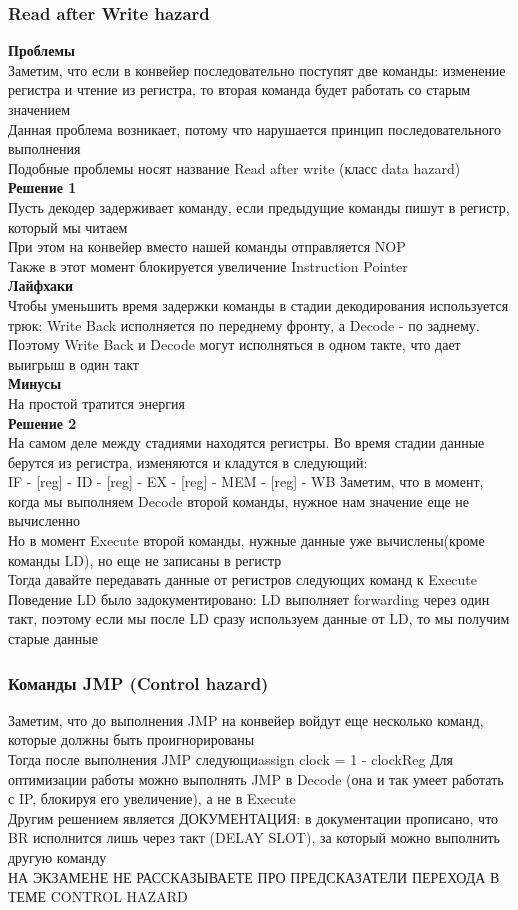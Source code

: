 \documentclass[12pt]{article}
\begin{document}
\subsubsection{Read after Write hazard}
\textbf{Проблемы}\\
Заметим, что если в конвейер последовательно поступят две команды: изменение регистра и чтение из регистра, то вторая команда будет работать со старым значением\\
Данная проблема возникает, потому что нарушается принцип последовательного выполнения\\
Подобные проблемы носят название Read after write (класс data hazard)\\
\textbf{Решение 1}\\
Пусть декодер задерживает команду, если предыдущие команды пишут в регистр, который мы читаем\\
При этом на конвейер вместо нашей команды отправляется NOP\\
Также в этот момент блокируется увеличение Instruction Pointer\\
\textbf{Лайфхаки}\\
Чтобы уменьшить время задержки команды в стадии декодирования используется трюк: Write Back исполняется по переднему фронту, а Decode - по заднему. Поэтому Write Back и Decode могут исполняться в одном такте, что дает выигрыш в один такт\\
\textbf{Минусы}\\
На простой тратится энергия\\
\textbf{Решение 2}\\
На самом деле между стадиями находятся регистры. Во время стадии данные берутся из регистра, изменяются и кладутся в следующий:\\
IF - [reg] - ID - [reg] - EX - [reg] - MEM - [reg] - WB
Заметим, что в момент, когда мы выполняем Decode второй команды, нужное нам значение еще не вычисленно\\
Но в момент Execute второй команды, нужные данные уже вычислены(кроме команды LD), но еще не записаны в регистр\\
Тогда давайте передавать данные от регистров следующих команд к Execute\\
Поведение LD было задокументировано: LD выполняет forwarding через один такт, поэтому если мы после LD сразу используем данные от LD, то мы получим старые данные
\subsubsection{Команды JMP (Control hazard)}
Заметим, что до выполнения JMP на конвейер войдут еще несколько команд, которые должны быть проигнорированы\\
Тогда после выполнения JMP следующиassign clock = 1 - clockReg %
Для оптимизации работы можно выполнять JMP в Decode (она и так умеет работать с IP, блокируя его увеличение), а не в Execute\\
Другим решением является ДОКУМЕНТАЦИЯ: в документации прописано, что BR исполнится лишь через такт (DELAY SLOT), за который можно выполнить другую команду\\
НА ЭКЗАМЕНЕ НЕ РАССКАЗЫВАЕТЕ ПРО ПРЕДСКАЗАТЕЛИ ПЕРЕХОДА В ТЕМЕ CONTROL HAZARD
\end{document}
